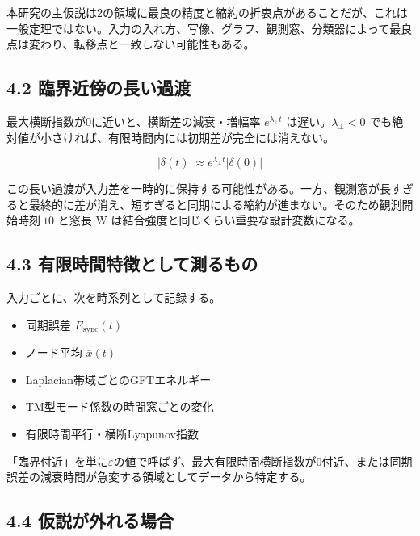 \documentclass[11pt,a4paper]{ltjsarticle}
\begin{document}
本研究の主仮説は2の領域に最良の精度と縮約の折衷点があることだが、これは一般定理ではない。入力の入れ方、写像、グラフ、観測窓、分類器によって最良点は変わり、転移点と一致しない可能性もある。\par

\subsection*{\textcolor{researchblue}{4.2 臨界近傍の長い過渡}}

最大横断指数が0に近いと、横断差の減衰・増幅率 \(e^{\lambda_{\perp}t}\) は遅い。\(\lambda_{\perp}<0\) でも絶対値が小さければ、有限時間内には初期差が完全には消えない。\par

\[
|\delta(t)|\approx e^{\lambda_{\perp}t}|\delta(0)|
\]

この長い過渡が入力差を一時的に保持する可能性がある。一方、観測窓が長すぎると最終的に差が消え、短すぎると同期による縮約が進まない。そのため観測開始時刻 t0 と窓長 W は結合強度と同じくらい重要な設計変数になる。\par

\subsection*{\textcolor{researchblue}{4.3 有限時間特徴として測るもの}}

入力ごとに、次を時系列として記録する。\par

\begin{itemize}

\item 同期誤差 \(E_{\mathrm{sync}}(t)\)

\item ノード平均 \(\bar{x}(t)\)

\item Laplacian帯域ごとのGFTエネルギー

\item TM型モード係数の時間窓ごとの変化

\item 有限時間平行・横断Lyapunov指数

\end{itemize}

「臨界付近」を単に\(\varepsilon\)の値で呼ばず、最大有限時間横断指数が0付近、または同期誤差の減衰時間が急変する領域としてデータから特定する。\par

\subsection*{\textcolor{researchblue}{4.4 仮説が外れる場合}}
\end{document}

